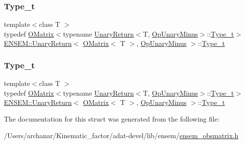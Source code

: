 \subsubsection{\texorpdfstring{Type\_t}{Type\_t}\hspace{0.1cm}{\footnotesize\ttfamily [2/3]}}
{\footnotesize\ttfamily template$<$class T $>$ \\
typedef \mbox{\hyperlink{classENSEM_1_1OMatrix}{O\+Matrix}}$<$typename \mbox{\hyperlink{structENSEM_1_1UnaryReturn}{Unary\+Return}}$<$T, \mbox{\hyperlink{structENSEM_1_1OpUnaryMinus}{Op\+Unary\+Minus}}$>$\+::\mbox{\hyperlink{structENSEM_1_1UnaryReturn_3_01OMatrix_3_01T_01_4_00_01OpUnaryMinus_01_4_a7ee85b64d167dda62c67b1c0e963de96}{Type\+\_\+t}}$>$ \mbox{\hyperlink{structENSEM_1_1UnaryReturn}{E\+N\+S\+E\+M\+::\+Unary\+Return}}$<$ \mbox{\hyperlink{classENSEM_1_1OMatrix}{O\+Matrix}}$<$ T $>$, \mbox{\hyperlink{structENSEM_1_1OpUnaryMinus}{Op\+Unary\+Minus}} $>$\+::\mbox{\hyperlink{structENSEM_1_1UnaryReturn_3_01OMatrix_3_01T_01_4_00_01OpUnaryMinus_01_4_a7ee85b64d167dda62c67b1c0e963de96}{Type\+\_\+t}}}

\mbox{\label{structENSEM_1_1UnaryReturn_3_01OMatrix_3_01T_01_4_00_01OpUnaryMinus_01_4_a7ee85b64d167dda62c67b1c0e963de96}} 
\subsubsection{\texorpdfstring{Type\_t}{Type\_t}\hspace{0.1cm}{\footnotesize\ttfamily [3/3]}}
{\footnotesize\ttfamily template$<$class T $>$ \\
typedef \mbox{\hyperlink{classENSEM_1_1OMatrix}{O\+Matrix}}$<$typename \mbox{\hyperlink{structENSEM_1_1UnaryReturn}{Unary\+Return}}$<$T, \mbox{\hyperlink{structENSEM_1_1OpUnaryMinus}{Op\+Unary\+Minus}}$>$\+::\mbox{\hyperlink{structENSEM_1_1UnaryReturn_3_01OMatrix_3_01T_01_4_00_01OpUnaryMinus_01_4_a7ee85b64d167dda62c67b1c0e963de96}{Type\+\_\+t}}$>$ \mbox{\hyperlink{structENSEM_1_1UnaryReturn}{E\+N\+S\+E\+M\+::\+Unary\+Return}}$<$ \mbox{\hyperlink{classENSEM_1_1OMatrix}{O\+Matrix}}$<$ T $>$, \mbox{\hyperlink{structENSEM_1_1OpUnaryMinus}{Op\+Unary\+Minus}} $>$\+::\mbox{\hyperlink{structENSEM_1_1UnaryReturn_3_01OMatrix_3_01T_01_4_00_01OpUnaryMinus_01_4_a7ee85b64d167dda62c67b1c0e963de96}{Type\+\_\+t}}}



The documentation for this struct was generated from the following file\+:\begin{DoxyCompactItemize}
\item 
/\+Users/archanar/\+Kinematic\+\_\+factor/adat-\/devel/lib/ensem/\mbox{\hyperlink{adat-devel_2lib_2ensem_2ensem__obsmatrix_8h}{ensem\+\_\+obsmatrix.\+h}}\end{DoxyCompactItemize}
